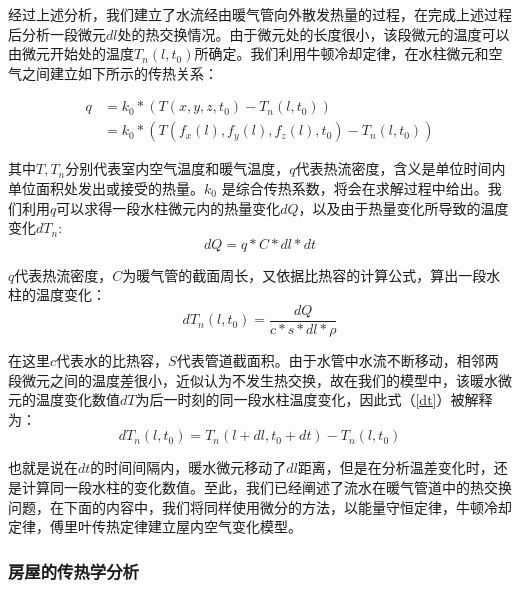 \documentclass{my_paper}
\begin{document}
经过上述分析，我们建立了水流经由暖气管向外散发热量的过程，在完成上述过程后分析一段微元$dl$处的热交换情况。由于微元处的长度很小，该段微元的温度可以由微元开始处的温度$T_n(l,t_0)$所确定。我们利用牛顿冷却定律\cite{1}，在水柱微元和空气之间建立如下所示的传热关系：

\begin{equation}
    \begin{aligned}
        q&= k_0*(T(x,y,z,t_0)-T_n(l,t_0))\\
        &= k_0 * (T(f_x(l),f_y(l),f_z(l),t_0)-T_n(l,t_0))
    \end{aligned}
    \label{11}
\end{equation}

其中$T,T_n$分别代表室内空气温度和暖气温度，$q$代表热流密度，含义是单位时间内单位面积处发出或接受的热量。$k_0$ 是综合传热系数，将会在求解过程中给出。我们利用$ q $可以求得一段水柱微元内的热量变化$dQ$，以及由于热量变化所导致的温度变化$dT_n$:
\begin{equation}
    dQ = q* C * dl * dt
\end{equation}

$q$代表热流密度，$C$为暖气管的截面周长，又依据比热容的计算公式，算出一段水柱的温度变化：
\begin{equation}
    dT_n(l,t_0) = \frac{dQ}{c*s*dl*\rho}
    \label{dt}
\end{equation}

在这里$c$代表水的比热容，$S$代表管道截面积。由于水管中水流不断移动，相邻两段微元之间的温度差很小，近似认为不发生热交换，故在我们的模型中，该暖水微元的温度变化数值$dT$为后一时刻的同一段水柱温度变化，因此式（\ref{dt}）被解释为：
\begin{equation}
dT_n(l,t_0) = T_n(l+dl,t_0+dt) - T_n(l,t_0)
\label{14}
\end{equation}

也就是说在$ dt $的时间间隔内，暖水微元移动了$dl$距离，但是在分析温差变化时，还是计算同一段水柱的变化数值。至此，我们已经阐述了流水在暖气管道中的热交换问题，在下面的内容中，我们将同样使用微分的方法，以能量守恒定律，牛顿冷却定律，傅里叶传热定律建立屋内空气变化模型。

\subsubsection{房屋的传热学分析}
\end{document}
